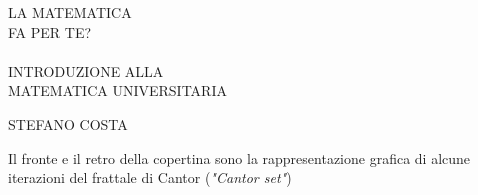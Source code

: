 \documentclass[twoside]{article} %
\newcommand{\blankpage}{\null\thispagestyle{empty}\addtocounter{page}{-1}\newpage}
\begin{document}
	\justify %
		
	\setcounter{page}{1}	
	
	\begin{center}
		\thispagestyle{empty}%
		\vspace*{4cm}
		{\Huge LA MATEMATICA \\\vspace{0.5cm} FA PER TE?}\\
		\hrulefill \\
		\vspace*{1cm}		
		{\large INTRODUZIONE ALLA \\MATEMATICA UNIVERSITARIA}
		\vspace{8cm}
		
		{STEFANO COSTA}
	\end{center}

	\afterpage{\blankpage}%
	\newpage
	
	\mbox{}
	\vfill
	\setcounter{page}{1}	
	\begin{center}
		\thispagestyle{empty}%
		{Il fronte e il retro della copertina sono la rappresentazione grafica di alcune iterazioni del frattale di Cantor (\textit{"Cantor set"})}
	\end{center}
		
	
		\afterpage{\blankpage}%
	\newpage
	
	\setcounter{page}{1}
	
\end{document}
